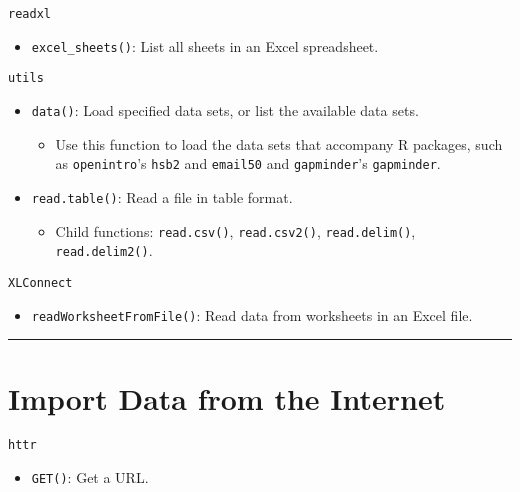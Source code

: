\documentclass[]{book}
\providecommand{\tightlist}{%
  \setlength{\itemsep}{0pt}\setlength{\parskip}{0pt}}
\theoremstyle{definition}
\theoremstyle{definition}
\theoremstyle{definition}
\theoremstyle{remark}
\begin{document}
\texttt{readxl}

\begin{itemize}
\tightlist
\item
  \texttt{excel\_sheets()}: List all sheets in an Excel spreadsheet.
\end{itemize}

\texttt{utils}

\begin{itemize}
\tightlist
\item
  \texttt{data()}: Load specified data sets, or list the available data
  sets.

  \begin{itemize}
  \tightlist
  \item
    Use this function to load the data sets that accompany R packages,
    such as \texttt{openintro}'s \texttt{hsb2} and \texttt{email50} and
    \texttt{gapminder}'s \texttt{gapminder}.
  \end{itemize}
\item
  \texttt{read.table()}: Read a file in table format.

  \begin{itemize}
  \tightlist
  \item
    Child functions: \texttt{read.csv()}, \texttt{read.csv2()},
    \texttt{read.delim()}, \texttt{read.delim2()}.
  \end{itemize}
\end{itemize}

\texttt{XLConnect}

\begin{itemize}
\tightlist
\item
  \texttt{readWorksheetFromFile()}: Read data from worksheets in an
  Excel file.
\end{itemize}

\begin{center}\rule{0.5\linewidth}{\linethickness}\end{center}

\section{Import Data from the
Internet}\label{import-data-from-the-internet}

\texttt{httr}

\begin{itemize}
\tightlist
\item
  \texttt{GET()}: Get a URL.
\end{itemize}
\end{document}
